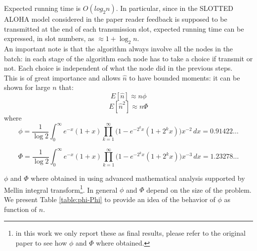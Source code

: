 \documentclass[12pt,a4paper]{report}
\begin{document}
Expected running time is $O(log_{2}n)$. In particular, since in the SLOTTED ALOHA model considered in the paper reader feedback is supposed to be transmitted at the end of each transmission slot, expected running time can be expressed, in slot numbers, as $\approx 1+\log_{2}n$.\\

An important note is that the algorithm always involve all the nodes in the batch: in each stage of the algorithm each node has to take a choice if transmit or not. 
Each choice is independent of what the node did in the previous steps. \\ 
This is of great importance and allows $\hat{n}$ to have bounded moments: it can be shown for large $n$ that:
\begin{equation}
E[\hat{n}] \approx n\phi
\end{equation}
\begin{equation}
E[\hat{n}^{2}] \approx n\Phi
\end{equation}
where
\begin{equation}
\phi= \frac{1}{\log2} \int_{0}^{\infty} \! e^{-x}(1+x) \prod_{k=1}^{\infty}\bigl(1-e^{-2^{k}x}(1+2^{k}x)\bigr)x^{-2} \, dx = 0.91422\dots
\end{equation}

\begin{equation}
\Phi= \frac{1}{\log2} \int_{0}^{\infty} \! e^{-x}(1+x) \prod_{k=1}^{\infty}\bigl(1-e^{-2^{k}x}(1+2^{k}x)\bigr)x^{-3} \, dx =1.23278\dots
\end{equation}

\noindent $\phi$ and $\Phi$ where obtained in \cite{greenberg87} using advanced mathematical analysis supported by Mellin integral transform\footnote{in this work we only report these as final results, please refer to the original paper to see how $\phi$ and $\Phi$ where obtained.}.
In general $\phi$ and $\Phi$ depend on the size of the problem. We present Table \ref{table:phi-Phi} to provide an idea of the behavior of $\phi$ as function of $n$.\\
\end{document}

